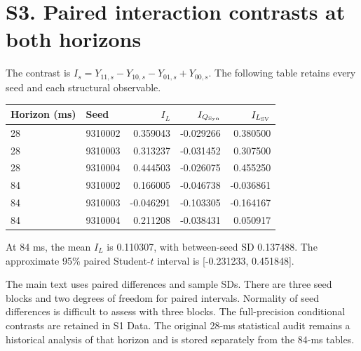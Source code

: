 \documentclass[11pt,letterpaper]{article}
\begin{document}
\section*{S3. Paired interaction contrasts at both horizons}
The contrast is $I_s=Y_{11,s}-Y_{10,s}-Y_{01,s}+Y_{00,s}$.
The following table retains every seed and each structural observable.
\begin{center}\small
\begin{tabular}{llrrr}
\toprule
Horizon (ms) & Seed & $I_L$ & $I_{Q_{\rm Syn}}$ & $I_{L_{\rm SV}}$ \\ \midrule
28 & 9310002 & 0.359043 & -0.029266 & 0.380500 \\
28 & 9310003 & 0.313237 & -0.031452 & 0.307500 \\
28 & 9310004 & 0.444503 & -0.026075 & 0.455250 \\
84 & 9310002 & 0.166005 & -0.046738 & -0.036861 \\
84 & 9310003 & -0.046291 & -0.103305 & -0.164167 \\
84 & 9310004 & 0.211208 & -0.038431 & 0.050917 \\
\bottomrule\end{tabular}\end{center}
At 84 ms, the mean $I_L$ is 0.110307, with between-seed SD 0.137488. The approximate 95\% paired Student-$t$ interval is [-0.231233, 0.451848].

The main text uses paired differences and sample SDs. There are three
seed blocks and two degrees of freedom for paired intervals. Normality
of seed differences is difficult to assess with three blocks. The
full-precision conditional contrasts are retained in S1 Data. The
original 28-ms statistical audit remains a historical analysis of that
horizon and is stored separately from the 84-ms tables.
\end{document}
